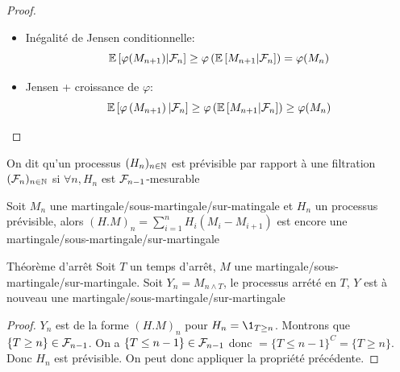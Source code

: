 \documentclass[]{report}
\begin{document}
    \begin{proof}
        \begin{itemize}
            \item Inégalité de Jensen conditionnelle:
            \[\mathbb{E}\left[\varphi(M_{n+1})|\mathcal{F}_n\right]\ge \varphi\left(\mathbb{E}\left[M_{n+1}|\mathcal{F}_n\right]\right)=\varphi(M_n)\]
            \item Jensen + croissance de $\varphi$:
            \[\mathbb{E}\left[\varphi\left(M_{n+1}\right)|\mathcal{F}_n\right]\ge \varphi\left(\mathbb{E}\left[M_{n+1}|\mathcal{F}_n\right]\right)\ge \varphi(M_n)\]
        \end{itemize}
    \end{proof}

    \begin{df}{}{}
        On dit qu'un processus $(H_n)_{n\in\mathbb{N}}$ est prévisible par rapport à une filtration $(\mathcal{F}_n)_{n\in\mathbb{N}}$ si $\forall n, H_n$ est $\mathcal{F}_{n-1}$-mesurable
    \end{df}

    \begin{prop}{}{}
        Soit $M_n$ une martingale/sous-martingale/sur-matingale et $H_n$ un processus prévisible, alors $(H.M)_n=\sum_{i=1}^{n}H_i(M_i-M_{i+1})$ est encore une martingale/sous-martingale/sur-martingale
    \end{prop}

    \begin{cor}{Théorème d'arrêt}{}
        Soit $T$ un temps d'arrêt, $M$ une martingale/sous-martingale/sur-martingale. Soit $Y_n=M_{n\wedge T}$, le processus arrété en $T$, $Y$ est à nouveau une martingale/sous-martingale/sur-martingale
    \end{cor}

    \begin{proof}
        $Y_n$ est de la forme $(H.M)_n$ pour $H_n=\1_{T\ge n}$. Montrons que $\{T\ge n\}\in \mathcal{F}_{n-1}$. On a $\{T\le n-1\}\in \mathcal{F}_{n-1}$ donc $=\{T\le n-1\}^C=\{T\ge n\}$. Donc $H_n$ est prévisible. On peut donc appliquer la propriété précédente.
    \end{proof}
\end{document}
